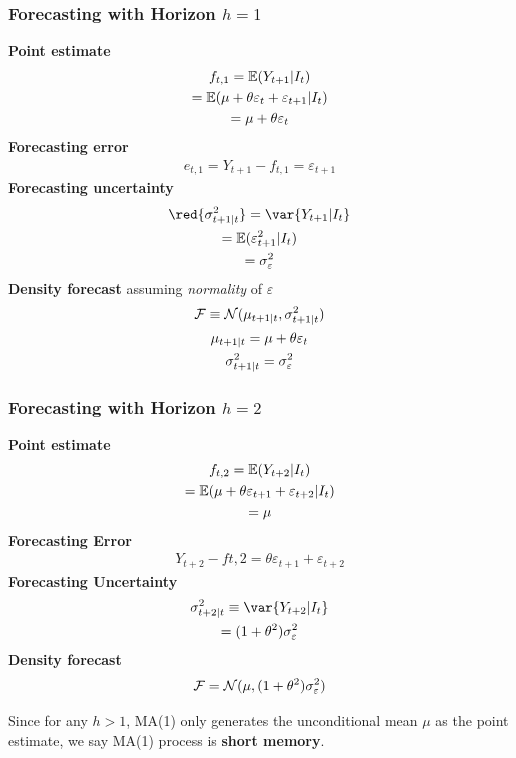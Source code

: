 \documentclass[11pt]{article}
\begin{document}
			\subsubsection{Forecasting with Horizon $h=1$}
				\textbf{Point estimate}
					\begin{gather}
						f_{t,1} = \mathbb{E}({Y_{t+1}|I_t}) \\
						= \mathbb{E}({\mu + \theta \varepsilon_{t} + \varepsilon_{t+1}|I_t}) \\
						= \mu + \theta \varepsilon_t
					\end{gather}
				\textbf{Forecasting error}
					\begin{gather}
						e_{t,1} = Y_{t+1} - f_{t,1} = \varepsilon_{t+1}
					\end{gather}
				\textbf{Forecasting uncertainty}
					\begin{gather}
						\red{\sigma_{t+1|t}^2} = \var{Y_{t+1}|I_t} \\
						= \expect{\varepsilon_{t+1}^2|I_t} \\
						= \sigma^2_\varepsilon
					\end{gather}
				\textbf{Density forecast} assuming \emph{normality} of $\varepsilon$
					\begin{gather}
						\mathcal{{F}} \equiv \mathcal{{N}}(\mu_{t+1|t}, \sigma_{t+1|t}^2) \\
						\mu_{t+1|t} = \mu + \theta \varepsilon_t \\
						\sigma_{t+1|t}^2 =  \sigma^2_\varepsilon
					\end{gather}
			\subsubsection{Forecasting with Horizon $h=2$}
				\textbf{Point estimate}
					\begin{gather}
						f_{t,2} = \mathbb{E}({Y_{t+2} | I_t}) \\
						= \mathbb{E}({\mu + \theta \varepsilon_{t+1} + \varepsilon_{t+2} | I_t}) \\
						= \mu
					\end{gather}
				\textbf{Forecasting Error}
					\begin{gather}
						Y_{t+2} - f{t,2} = \theta \varepsilon_{t+1} + \varepsilon_{t+2}
					\end{gather}
				\textbf{Forecasting Uncertainty}
					\begin{gather}
						\sigma_{t+2|t}^2 \equiv \var{Y_{t+2} | I_t} \\
						= (1 + \theta^2) \sigma_{\varepsilon}^2 
					\end{gather}
				\textbf{Density forecast}
					\begin{gather}
						\mathcal{{F}} = \mathcal{{N}}(\mu, (1 + \theta^2)\sigma_{\varepsilon}^2)
					\end{gather}
				\begin{remark}
					Since for any $h > 1$, MA(1) only generates the unconditional mean $\mu$ as the point estimate, we say MA(1) process is \textbf{short memory}.
				\end{remark}
\end{document}
